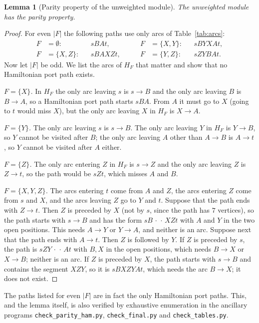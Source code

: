 \documentclass[11pt]{amsart}
\newtheorem{lemma}[theorem]{Lemma}
\theoremstyle{definition}
\theoremstyle{remark}
\numberwithin{equation}{section}
\begin{document}
\begin{lemma}[Parity property of the unweighted module]\label{lem:parity}
The unweighted module has the parity property.
\end{lemma}

\begin{proof}
For even $|F|$ the following paths use only arcs of Table~\ref{tab:arcs}:
\[
\begin{aligned}
F&=\emptyset: && sBAt, &\qquad F&=\{X,Y\}: && sBYXAt,\\
F&=\{X,Z\}: && sBAXZt, &\qquad F&=\{Y,Z\}: && sZYBAt.
\end{aligned}
\]
Now let $|F|$ be odd. We list the arcs of $H_F$ that matter and show that no Hamiltonian port path exists.

\emph{$F=\{X\}$.} In $H_F$ the only arc leaving $s$ is $s\to B$ and the only arc leaving $B$ is $B\to A$, so a Hamiltonian port path starts $sBA$. From $A$ it must go to $X$ (going to $t$ would miss $X$), but the only arc leaving $X$ in $H_F$ is $X\to A$.

\emph{$F=\{Y\}$.} The only arc leaving $s$ is $s\to B$. The only arc leaving $Y$ in $H_F$ is $Y\to B$, so $Y$ cannot be visited after $B$; the only arc leaving $A$ other than $A\to B$ is $A\to t$, so $Y$ cannot be visited after $A$ either.

\emph{$F=\{Z\}$.} The only arc entering $Z$ in $H_F$ is $s\to Z$ and the only arc leaving $Z$ is $Z\to t$, so the path would be $sZt$, which misses $A$ and $B$.

\emph{$F=\{X,Y,Z\}$.} The arcs entering $t$ come from $A$ and $Z$, the arcs entering $Z$ come from $s$ and $X$, and the arcs leaving $Z$ go to $Y$ and $t$. Suppose that the path ends with $Z\to t$. Then $Z$ is preceded by $X$ (not by $s$, since the path has $7$ vertices), so the path starts with $s\to B$ and has the form $sB\,\cdot\,\cdot\,XZt$ with $A$ and $Y$ in the two open positions. This needs $A\to Y$ or $Y\to A$, and neither is an arc. Suppose next that the path ends with $A\to t$. Then $Z$ is followed by $Y$. If $Z$ is preceded by $s$, the path is $sZY\,\cdot\,\cdot\,At$ with $B,X$ in the open positions, which needs $B\to X$ or $X\to B$; neither is an arc. If $Z$ is preceded by $X$, the path starts with $s\to B$ and contains the segment $XZY$, so it is $sBXZYAt$, which needs the arc $B\to X$; it does not exist.
\end{proof}

The paths listed for even $|F|$ are in fact the only Hamiltonian port paths. This, and the lemma itself, is also verified by exhaustive enumeration in the ancillary programs \texttt{check\_parity\_ham.py}, \texttt{check\_final.py} and \texttt{check\_tables.py}.
\end{document}
